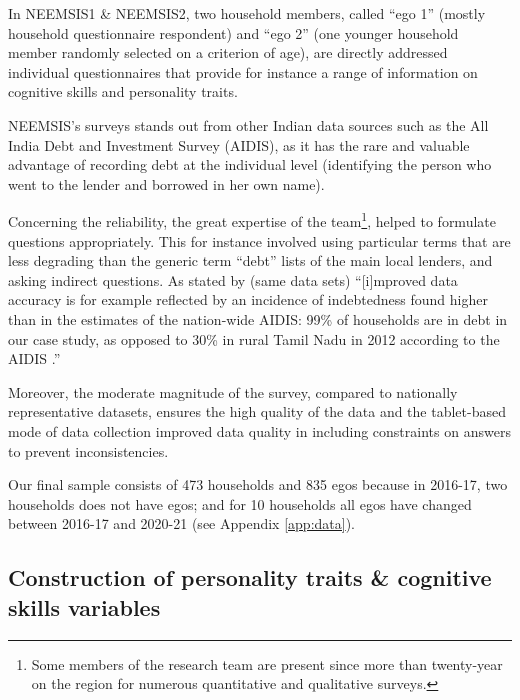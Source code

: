 \documentclass[a4paper, 11pt, onecolumn]{article}
\begin{document}
In NEEMSIS1 \& NEEMSIS2, two household members, called ``ego 1'' (mostly household questionnaire respondent) and ``ego 2'' (one younger household member randomly selected on a criterion of age), are directly addressed individual questionnaires that provide for instance a range of information on cognitive skills and personality traits.

NEEMSIS's surveys stands out from other Indian data sources such as the All India Debt and Investment Survey (AIDIS), as it has the rare and valuable advantage of recording debt at the individual level (identifying the person who went to the lender and borrowed in her own name).

Concerning the reliability, the great expertise of the team\footnote{Some members of the research team are present since more than twenty-year on the region for numerous quantitative and qualitative surveys.}, helped to formulate questions appropriately.
This for instance involved using particular terms that are less degrading than the generic term ``debt'' lists of the main local lenders, and asking indirect questions.
As stated by \cite{Reboul2021} (same data sets) ``[i]mproved data accuracy is for example reflected by an incidence of indebtedness found higher than in the estimates of the nation-wide AIDIS: 99\% of households are in debt in our case study, as opposed to 30\% in rural Tamil Nadu in 2012 according to the AIDIS \citep{NSSO2014}.'' 

Moreover, the moderate magnitude of the survey, compared to nationally representative datasets, ensures the high quality of the data and the tablet-based mode of data collection improved data quality in including constraints on answers to prevent inconsistencies. 

Our final sample consists of 473 households and 835 egos because in 2016-17, two households does not have egos; and for 10 households all egos have changed between 2016-17 and 2020-21 (see Appendix \ref{app:data}).







	\subsection{Construction of personality traits \& cognitive skills variables }
\end{document}
